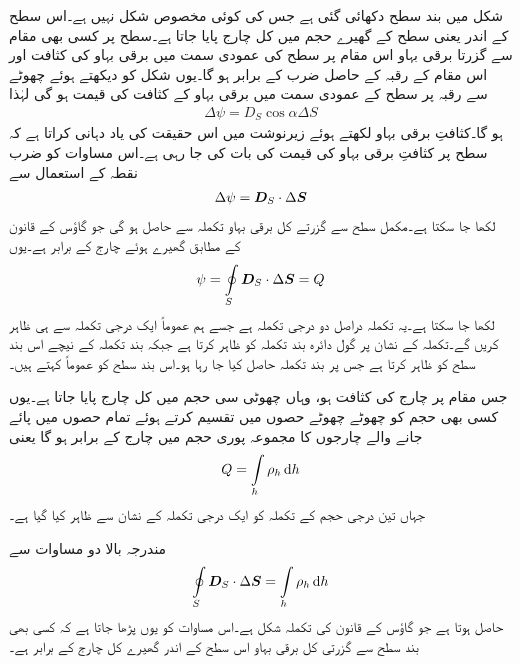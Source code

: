 شکل  میں  بند سطح دکھائی گئی ہے جس کی کوئی مخصوص شکل نہیں ہے۔اس سطح کے اندر یعنی سطح کے گھیرے حجم میں کل  چارج  پایا جاتا ہے۔سطح پر کسی بھی مقام سے گزرتا برقی بہاو اس مقام پر سطح کی عمودی سمت میں برقی بہاو کی کثافت اور اس مقام کے رقبہ کے حاصل ضرب کے برابر ہو گا۔یوں شکل کو دیکھتے ہوئے  چھوٹے سے رقبہ  پر سطح کے عمودی سمت میں برقی بہاو کے کثافت  کی قیمت  ہو گی لہٰذا
\begin{align*}
\Delta \psi =D_S \cos \alpha  \Delta S
\end{align*}
ہو گا۔کثافتِ برقی بہاو  لکھتے ہوئے زیرنوشت میں  اس حقیقت کی یاد دہانی کراتا ہے کہ سطح پر کثافتِ برقی بہاو کی قیمت کی بات کی جا رہی ہے۔اس مساوات کو ضرب نقطہ کے استعمال سے
\begin{align*}
\Delta \psi ={{\boldsymbol{D}}}_S \cdot \Delta {\ensuremath{{\boldsymbol{S}}}}
\end{align*}
لکھا جا سکتا ہے۔مکمل سطح سے گزرتے کل برقی بہاو تکملہ سے حاصل ہو گی جو گاؤس کے قانون کے مطابق گھیرے ہوئے چارج  کے برابر ہے۔یوں
\begin{align}
\psi=\oint\limits_{S} {{\boldsymbol{D}}}_S \cdot \Delta {\ensuremath{{\boldsymbol{S}}}}=Q
\end{align}
لکھا جا سکتا ہے۔یہ تکملہ دراصل دو درجی  تکملہ ہے جسے ہم عموماً ایک درجی تکملہ سے ہی ظاہر کریں گے۔تکملہ کے نشان پر گول دائرہ بند تکملہ کو ظاہر کرتا ہے جبکہ بند تکملہ  کے  نیچے  اس بند سطح کو ظاہر کرتا ہے جس پر بند تکملہ حاصل کیا جا رہا ہو۔اس بند سطح کو عموماً  کہتے ہیں۔

جس مقام پر چارج کی کثافت  ہو، وہاں  چھوٹی سی حجم  میں کل چارج   پایا جاتا ہے۔یوں کسی بھی حجم کو چھوٹے چھوٹے حصوں میں تقسیم کرتے ہوئے تمام حصوں میں پائے جانے والے چارجوں کا مجموعہ پوری حجم میں چارج کے برابر ہو گا یعنی
\begin{align}\label{مساوات_گاؤس_کل_حجمی_چارج}
Q=\int\limits_{h} \rho_h \dif h
 \end{align}
جہاں تین درجی حجم کے تکملہ کو ایک درجی تکملہ کے نشان سے ظاہر کیا گیا ہے۔

مندرجہ بالا دو مساوات سے
\begin{align}\label{مساوات_گاؤس_کے_قانون_کی_تکملہ_شکل}
\oint\limits_{S} \kvec{D}_S \cdot \Delta \kvec{S}=\int\limits_{h} \rho_h \dif h
\end{align}
حاصل ہوتا ہے جو گاؤس کے قانون کی تکملہ شکل ہے۔اس مساوات کو یوں پڑھا جاتا ہے کہ کسی بھی بند سطح سے گزرتی کل برقی بہاو اس سطح کے اندر گھیرے کل چارج کے برابر  ہے۔

